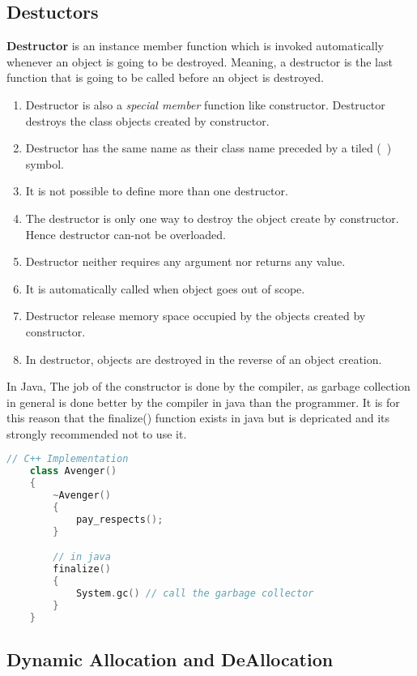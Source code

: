 \documentclass[11pt]{article}
\begin{document}
\subsection{Destuctors}
\textbf{Destructor} is an instance member function which is invoked automatically whenever an object is going to be destroyed. Meaning, a destructor is the last function that is going to be called before an object is destroyed.

\begin{enumerate}
	\item Destructor is also a \textit{special member} function like constructor. Destructor destroys the class objects created by constructor.
	\item Destructor has the same name as their class name preceded by a tiled (~) symbol.
	\item It is not possible to define more than one destructor. 
	\item The destructor is only one way to destroy the object create by constructor. Hence destructor can-not be overloaded.
	\item Destructor neither requires any argument nor returns any value.
	\item It is automatically called when object goes out of scope. 
	\item Destructor release memory space occupied by the objects created by constructor.
	\item In destructor, objects are destroyed in the reverse of an object creation.
\end{enumerate}

In Java, The job of the constructor is done by the compiler, as garbage collection in general is done better by the compiler in java than the programmer. It is for this reason that the finalize() function exists in java but is depricated and its strongly recommended not to use it. \\
\begin{lstlisting}[language = C++]
	// C++ Implementation 
	class Avenger()
	{
		~Avenger()
		{
			pay_respects();
		}

		// in java
		finalize()
		{
			System.gc() // call the garbage collector
		}
	}

\end{lstlisting}


\subsection{Dynamic Allocation and DeAllocation}
\end{document}
